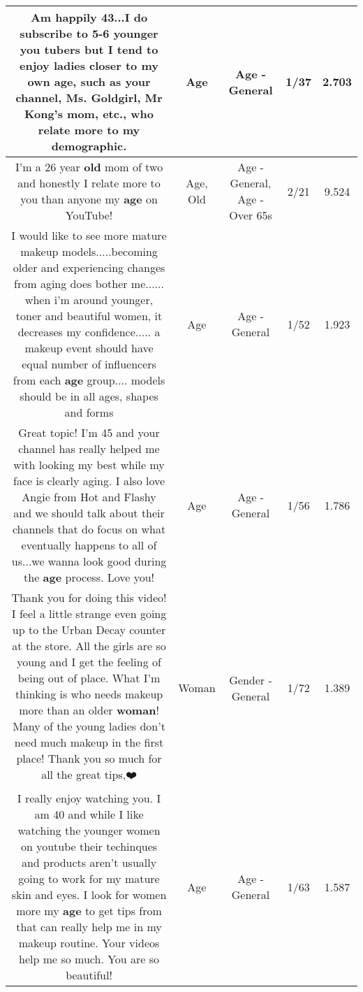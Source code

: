 \documentclass[11pt]{article}
\newlength\mylength
\begin{document}
\begin{center}
\begin{longtable}{|C{.65\mylength}|C{.30\mylength}|C{.12\mylength}|C{.12\mylength}|C{.12\mylength}|}
  \small Am happily 43...I do subscribe to 5-6 younger  you tubers but I tend to enjoy ladies closer to my own \textbf{age}, such as your channel,  Ms. Goldgirl, Mr Kong's mom, etc., who relate more to my demographic.\normalsize   & Age & Age - General & 1/37 & 2.703 \\  \hline
  \small I'm a 26 year \textbf{old} mom of two and honestly I relate more to you than anyone my \textbf{age} on YouTube!\normalsize   & Age, Old & Age - General, Age - Over 65s & 2/21 & 9.524 \\  \hline
  \small I would like to see more mature makeup models.....becoming older and experiencing changes from aging does bother me...... when i'm around younger, toner and beautiful women, it decreases my confidence..... a makeup event should have equal number of influencers from each \textbf{age} group.... models should be in all ages,  shapes and forms\normalsize   & Age & Age - General & 1/52 & 1.923 \\  \hline
  \small Great topic!  I'm 45 and your channel has really helped me with looking my best while my face is clearly aging.  I also love Angie from Hot and Flashy and we should talk about their channels that do focus on what eventually happens to all of us...we wanna look good during the \textbf{age} process.  Love you!\normalsize   & Age & Age - General & 1/56 & 1.786 \\  \hline
  \small Thank you for doing this video!  I feel a little strange even going up to the Urban Decay counter at the store.  All the girls are so young and I get the feeling of being out of place.   What I'm thinking is who needs makeup more than an older \textbf{woman}!  Many of the young ladies don't need much makeup in the first place!  Thank you so much for all the great tips,❤️\normalsize   & Woman & Gender - General & 1/72 & 1.389 \\  \hline
  \small I really enjoy watching you. I am 40 and while I like watching the younger women on youtube their techinques and products aren't usually going to work for my mature skin and eyes. I look for women more my \textbf{age} to get tips from that can really help me in my makeup routine. Your videos help me so much. You are so beautiful!\normalsize   & Age & Age - General & 1/63 & 1.587 \\  \hline

\end{longtable}
\end{center}
\end{document}
